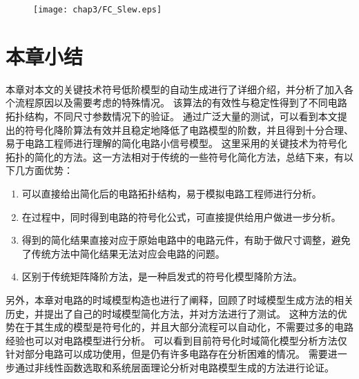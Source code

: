\begin{figure}[!htp]
	\centering
	\texttt{[image: chap3/FC\_Slew.eps]}
\end{figure}

\section{本章小结}
\label{sec:simp:con}

本章对本文的关键技术符号低阶模型的自动生成进行了详细介绍，并分析了加入各个流程原因以及需要考虑的特殊情况。
该算法的有效性与稳定性得到了不同电路拓扑结构，不同尺寸参数情况下的验证。
通过广泛大量的测试，可以看到本文提出的符号化降阶算法有效并且稳定地降低了电路模型的阶数，并且得到十分合理、易于电路工程师进行理解的简化电路小信号模型。
这里采用的关键技术为符号化拓扑的简化的方法。这一方法相对于传统的一些符号化简化方法，总结下来，有以下几方面优势：

\begin{enumerate}[label=\emph{\alph*})]
	\item 可以直接给出简化后的电路拓扑结构，易于模拟电路工程师进行分析。
	\item 在过程中，同时得到电路的符号化公式，可直接提供给用户做进一步分析。
	\item 得到的简化结果直接对应于原始电路中的电路元件，有助于做尺寸调整，避免了传统方法中简化结果无法对应会电路的问题。
	\item 区别于传统矩阵降阶方法，是一种启发式的符号化模型降阶方法。
\end{enumerate}

另外，本章对电路的时域模型构造也进行了阐释，回顾了时域模型生成方法的相关历史，并提出了自己的时域模型简化方法，并对方法进行了测试。
这种方法的优势在于其生成的模型是符号化的，并且大部分流程可以自动化，不需要过多的电路经验也可以对电路模型进行分析。
可以看到目前符号化时域简化模型分析方法仅针对部分电路可以成功使用，但是仍有许多电路存在分析困难的情况。
需要进一步通过非线性函数选取和系统层面理论分析对电路模型生成的方法进行论证。